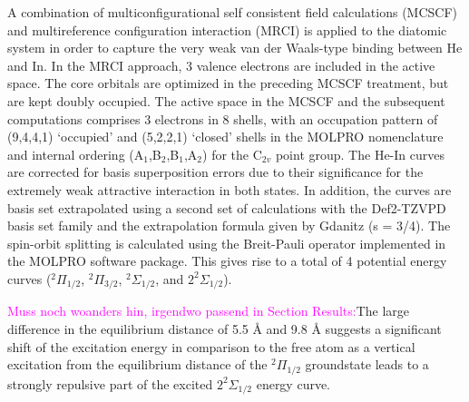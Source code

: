 \documentclass[twoside,twocolumn,9pt]{article}
\def\hl#1{\textcolor{magenta}{#1}}  %
\begin{document}
A combination of multiconfigurational self consistent field calculations (MCSCF\cite{Knowles1985, Werner1985}) and multireference configuration interaction (MRCI\cite{WK88, KW92}) is applied to the diatomic system in order to capture the very weak van der Waals-type binding between He and In. In the MRCI approach, 3 valence electrons are included in the active space. The core orbitals are optimized in the preceding MCSCF treatment, but are kept doubly occupied.
The active space in the MCSCF and the subsequent computations comprises 3 electrons in 8 shells, with an occupation pattern of (9,4,4,1) `occupied' and (5,2,2,1) `closed' shells in the MOLPRO nomenclature and internal ordering (A$_1$,B$_2$,B$_1$,A$_2$) for the C$_{2v}$ point group. The He-In curves are corrected for basis superposition errors due to their significance for the extremely weak attractive interaction in both states.\cite{boys70} In addition, the curves are basis set extrapolated using a second set of calculations with the Def2-TZVPD basis set family and the extrapolation formula given by Gdanitz \cite{Gdanitz2000} (s = 3/4). The spin-orbit splitting is calculated using the Breit-Pauli operator implemented in the MOLPRO software package. This gives rise to a total of 4 potential energy curves ($^2\Pi_{1/2}$, $^2\Pi_{3/2} $, $^2\Sigma_{1/2} $, and $2^2\Sigma_{1/2}$). 

\hl{Muss noch woanders hin, irgendwo passend in Section Results:}The large difference in the equilibrium distance of 5.5 \AA{} and 9.8 \AA{} suggests a significant shift of the excitation energy in comparison to the free atom as a vertical excitation from the equilibrium distance of the $^2\Pi_{1/2}$ groundstate leads to a strongly repulsive part of the excited $2^2\Sigma{}_{1/2}$ energy curve. 
\end{document}

